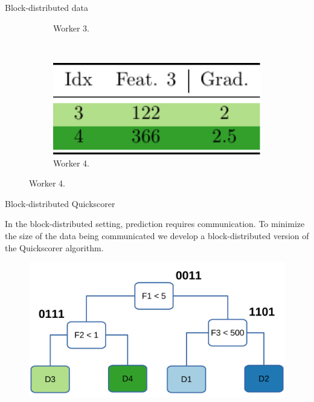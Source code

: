 \documentclass[final]{beamer}
\newlength{\onecolwid}
\begin{document}
\begin{frame}[t]
\begin{columns}[t]
\begin{column}{\onecolwid}
\begin{block}{Block-distributed data}
\begin{figure}
\begin{subfigure}[t]{0.45\onecolwid}
			\caption{Worker 3.}
			\end{subfigure}
			~
			\begin{subfigure}[t]{0.45\onecolwid}
				\centering
				\includegraphics[height=4cm]{w4}
				\caption{Worker 4.}
			\end{subfigure}
		
			\label{fig:grad-row-dist}
		\end{figure}
		

	\end{block}
	
	
	\begin{block}{Block-distributed Quickscorer}
		
		In the block-distributed setting, prediction requires communication.
		To minimize the size of the data being communicated we develop
		a block-distributed version of the Quickscorer algorithm.
		
		\begin{figure}
			\includegraphics[width=\onecolwid]{decision_tree_bitstrings}
			\label{fig:quickscorer}
		\end{figure}
		
	\end{block}
	

\end{column}
\end{columns}
\end{frame}
\end{document}
